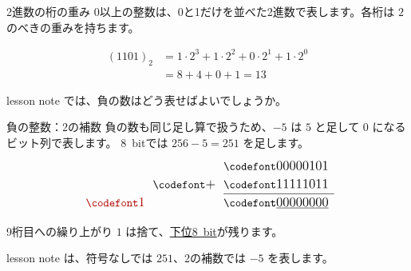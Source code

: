 \documentclass[12pt,aspectratio=43]{beamer}
\newcommand{\code}[1]{{\codefont #1}}
\newenvironment{lessonbox}
  {\begin{beamercolorbox}[wd=\linewidth,sep=1.5mm]{lesson note}}
  {\end{beamercolorbox}\par}
\begin{document}
\begin{frame}[t]{2進数の桁の重み}
  0以上の整数は、0と1だけを並べた2進数で表します。各桁は $2$ のべきの重みを持ちます。
  \begin{center}
  \end{center}
  \vspace{-2mm}
  \[
    \begin{aligned}
      (1101)_2 &= 1\cdot2^3+1\cdot2^2+0\cdot2^1+1\cdot2^0 \\
      &= 8+4+0+1=13
    \end{aligned}
  \]
  \vfill
  \begin{lessonbox}
    では、負の数はどう表せばよいでしょうか。
  \end{lessonbox}
\end{frame}

\begin{frame}[t]{負の整数：2の補数}
  \begingroup
  \setlength{\parskip}{1mm}
  \setlength{\abovedisplayskip}{4pt}
  \setlength{\belowdisplayskip}{4pt}
  負の数も同じ足し算で扱うため、$-5$ は $5$ と足して $0$ になるビット列で表します。
  8~bitでは $256-5=251$ を足します。
  \[
    \renewcommand{\arraystretch}{1.35}
    \begin{array}{r@{\hspace{2.5mm}}r@{\hspace{2.5mm}}r}
      & & \text{\codefont\large 00000101} \\
      & \text{\codefont\large $+$} & \text{\codefont\large 11111011} \\ \cline{3-3}
      \textcolor{red!70!black}{\text{\codefont\large 1}} & & \text{\codefont\large \underline{00000000}}
    \end{array}
  \]
  \begin{center}
    9桁目への繰り上がり $1$ は捨て、\underline{下位8~bit}が残ります。
  \end{center}
  \vfill
  \begin{lessonbox}
    \code{11111011} は、符号なしでは $251$、2の補数では $-5$ を表します。
  \end{lessonbox}
  \endgroup
\end{frame}
\end{document}
